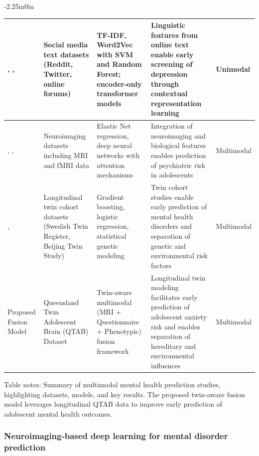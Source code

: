 \documentclass[10pt,letterpaper]{article}
\begin{document}
\begin{table}[!t]
\begin{adjustwidth}{-2.25in}{0in}
\begin{tabular}{|p{2.0cm}|p{3.5cm}|p{3.8cm}|p{4.8cm}|p{1.8cm}|}
        \cite{ref11}, \cite{ref13}, \cite{ref17}
        & Social media text datasets (Reddit, Twitter, online forums)
        & TF-IDF, Word2Vec with SVM and Random Forest; encoder-only transformer models
        & Linguistic features from online text enable early screening of depression through contextual representation learning
        & Unimodal \\
        \hline

        \cite{ref23}, \cite{ref25}, \cite{ref46}
        & Neuroimaging datasets including MRI and fMRI data
        & Elastic Net regression, deep neural networks with attention mechanisms
        & Integration of neuroimaging and biological features enables prediction of psychiatric risk in adolescents
        & Multimodal \\
        \hline

        \cite{ref33}, \cite{ref34}
        & Longitudinal twin cohort datasets (Swedish Twin Register, Beijing Twin Study)
        & Gradient boosting, logistic regression, statistical genetic modeling
        & Twin cohort studies enable early prediction of mental health disorders and separation of genetic and environmental risk factors
        & Multimodal \\
        \hline

        Proposed Fusion Model
        & Queensland Twin Adolescent Brain (QTAB) Dataset~\cite{ref31,ref32}
        & Twin-aware multimodal (MRI + Questionnaire + Phenotypic) fusion framework
        & Longitudinal twin modeling facilitates early prediction of adolescent anxiety risk and enables separation of hereditary and environmental influences
        & Multimodal \\
        \hline

        \end{tabular}

        \begin{flushleft}
        Table notes: Summary of multimodal mental health prediction studies, highlighting datasets, models, and key results. The proposed twin-aware fusion model leverages longitudinal QTAB data to improve early prediction of adolescent mental health outcomes.
        \end{flushleft}

        \end{adjustwidth}
        \end{table}

        \subsubsection*{Neuroimaging-based deep learning for mental disorder prediction}
\end{document}
